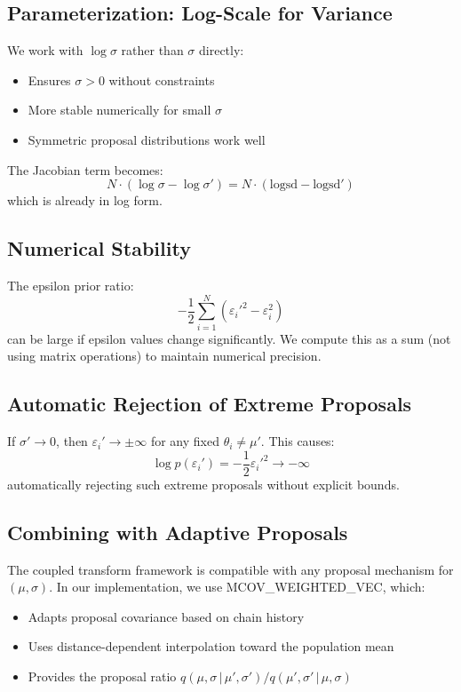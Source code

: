 \documentclass[11pt,a4paper]{article}
\theoremstyle{definition}
\newcommand{\eps}{\varepsilon}
\newcommand{\given}{\,|\,}
\begin{document}
\subsection{Parameterization: Log-Scale for Variance}

We work with $\log \sigma$ rather than $\sigma$ directly:
\begin{itemize}
    \item Ensures $\sigma > 0$ without constraints
    \item More stable numerically for small $\sigma$
    \item Symmetric proposal distributions work well
\end{itemize}

The Jacobian term becomes:
\begin{equation}
    N \cdot (\log \sigma - \log \sigma') = N \cdot (\text{logsd} - \text{logsd}')
\end{equation}
which is already in log form.

\subsection{Numerical Stability}

The epsilon prior ratio:
\begin{equation}
    -\frac{1}{2}\sum_{i=1}^N (\eps_i'^2 - \eps_i^2)
\end{equation}
can be large if epsilon values change significantly. We compute this as a sum
(not using matrix operations) to maintain numerical precision.

\subsection{Automatic Rejection of Extreme Proposals}

If $\sigma' \to 0$, then $\eps_i' \to \pm\infty$ for any fixed $\theta_i \neq \mu'$.
This causes:
\begin{equation}
    \log p(\eps_i') = -\frac{1}{2}\eps_i'^2 \to -\infty
\end{equation}
automatically rejecting such extreme proposals without explicit bounds.

\subsection{Combining with Adaptive Proposals}

The coupled transform framework is compatible with any proposal mechanism for
$(\mu, \sigma)$. In our implementation, we use MCOV\_WEIGHTED\_VEC, which:
\begin{itemize}
    \item Adapts proposal covariance based on chain history
    \item Uses distance-dependent interpolation toward the population mean
    \item Provides the proposal ratio $q(\mu, \sigma \given \mu', \sigma') / q(\mu', \sigma' \given \mu, \sigma)$
\end{itemize}
\end{document}

